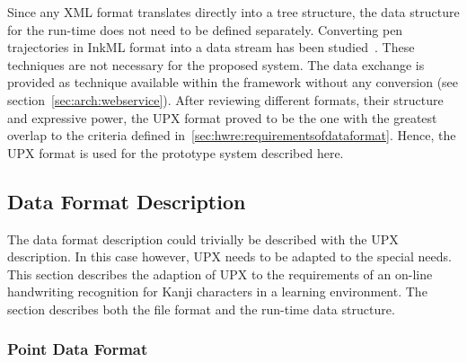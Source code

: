 Since any XML format translates directly into a tree structure, the data 
structure for the run-time does not need to be defined separately.
Converting pen trajectories in InkML format into a data stream has been 
studied~. These techniques are not necessary 
for the proposed system. The data exchange is provided as technique available
within the framework without any conversion (see 
section~\ref{sec:arch:webservice}).
After reviewing different formats, their structure and expressive power,
the UPX format proved to be the one with the greatest overlap to the
criteria defined in~\ref{sec:hwre:requirementsofdataformat}. Hence, the
UPX format is used for the prototype system described here.

\subsection{Data Format Description}
\label{sec:hwre:dataformatdescription}




The data format description could trivially be described with the UPX 
description. In this case however, UPX needs to be adapted to the special needs.
This section describes the adaption of UPX to the requirements of an on-line
handwriting recognition for Kanji characters in a learning environment.
The section describes both the file format and the run-time data structure.

\subsubsection{Point Data Format}
\label{sec:hwre:pointdataformat}

